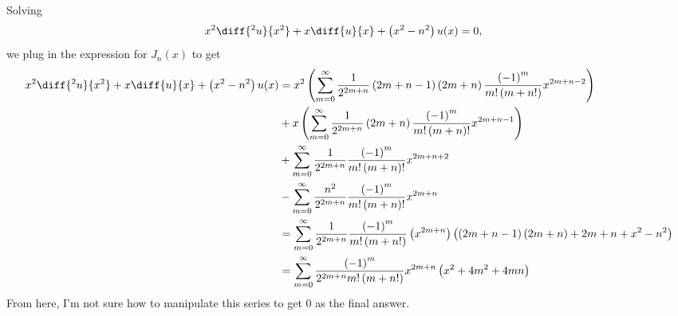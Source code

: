 \documentclass[10pt]{mypackage}
\begin{document}
\begin{solution}[35.7]
  Solving
  \begin{align*}
    x^2\diff{^2u}{x^2} + x\diff{u}{x} + \left( x^2 - n^2 \right)u(x) &= 0,
  \end{align*}
  we plug in the expression for $J_n(x)$ to get
  \begin{align*}
    x^2\diff{^2u}{x^2} + x\diff{u}{x} + \left( x^2 - n^2 \right)u(x) &=x^2\left( \sum_{m=0}^{\infty} \frac{1}{2^{2m + n}}\left( 2m+n-1 \right)\left( 2m+n \right)\frac{\left( -1 \right)^{m}}{m!\left( m+n! \right)} x^{2m + n - 2}  \right)\\
                                                                     &+ x \left( \sum_{m=0}^{\infty}\frac{1}{2^{2m + n}}\left( 2m + n \right) \frac{\left( -1 \right)^{m}}{m!\left( m+n \right)!}x^{2m + n - 1} \right)\\
                                                                     &+ \sum_{m=0}^{\infty} \frac{1}{2^{2m + n}} \frac{\left( -1 \right)^{m}}{m!\left( m+n \right)!}x^{2m + n + 2}\\
                                                                     & - \sum_{m=0}^{\infty}\frac{n^2}{2^{2m + n}}\frac{\left( -1 \right)^{m}}{m!\left( m+n \right)!}x^{2m + n}\\
                                                                     &= \sum_{m=0}^{\infty}\frac{1}{2^{2m + n}}\frac{\left( -1 \right)^{m}}{m!\left( m+n! \right)}\left( x^{2m + n} \right)\left( \left( 2m + n - 1 \right)\left( 2m + n \right) + 2m + n + x^2 - n^2 \right)\\
                                                                     &= \sum_{m=0}^{\infty}\frac{\left( -1 \right)^{m}}{2^{2m + n}m!\left( m+n! \right)}x^{2m + n}\left( x^2 + 4m^2 + 4mn \right)
  \end{align*}
  From here, I'm not sure how to manipulate this series to get $0$ as the final answer.
\end{solution}
\end{document}

